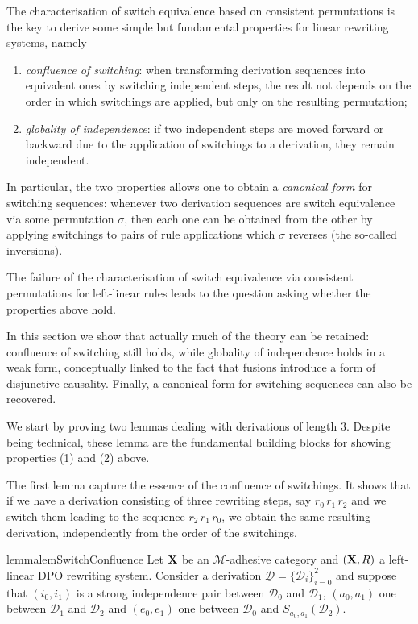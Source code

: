 \documentclass[a4paper,UKenglish,cleveref,pdftex, thm-restate,numberwithinsect,anonymous]{lipics}
\def\R{\mathsf{R}}
\def\X{\textbf {\textup{X}}}
\newcommand{\dder}[1]{\mathscr{#1}}
\newcommand{\der}[1]{\underline{\dder{#1}}}
\begin{document}
The characterisation of switch equivalence based on consistent permutations is the key to
derive some simple but fundamental properties for linear rewriting systems, namely
\begin{enumerate}
\item \emph{confluence of switching}: when transforming derivation
  sequences into equivalent ones by switching independent steps, the
  result not depends on the order in which switchings are applied, but
  only on the resulting permutation;
  
\item \emph{globality of independence}: if two independent steps are
  moved forward or backward due to the application of switchings to a
  derivation, they remain independent.
\end{enumerate}


In particular, the two properties allows one to obtain a \emph{canonical form} for switching sequences: whenever two derivation sequences are switch equivalence via some permutation $\sigma$, then each one can be obtained from the other by applying switchings to pairs of rule applications which $\sigma$ reverses (the so-called inversions).

The failure of the characterisation of switch equivalence via
consistent permutations for left-linear rules leads to the
question asking whether the properties above hold.

In this section we show that actually much of the theory can be retained: confluence of switching still holds, while globality of independence holds in a weak form, conceptually linked to the fact that fusions introduce a form of disjunctive causality. Finally, a canonical form for switching sequences can also be recovered.

We start by proving two lemmas dealing with derivations of length
$3$. Despite being technical, these lemma are the fundamental building blocks for showing properties (1) and (2) above.

The first lemma capture the essence of the confluence of
switchings. It shows that if we have a derivation consisting of three
rewriting steps, say $r_0\, r_1\, r_2$ and we switch them leading to the
sequence $r_2\, r_1\, r_0$, we obtain the same resulting derivation,
independently from the order of the switchings.


\begin{restatable}{lemma}{lemSwitchConfluence}
  \label{lem:switch-confluence}
  Let $\X$ be an $\mathcal{M}$-adhesive category and $(\X,\R)$ a
  left-linear DPO rewriting system.
  Consider a derivation $\der{D}=\{\dder{D}_i\}_{i=0}^2$ and suppose
  that $(i_0,i_1)$ is a strong independence pair between $\dder{D}_0$
  and $\dder{D}_1$, $(a_0,a_1)$ one between $\dder{D}_1$ and
  $\dder{D}_2$ and $(e_0, e_1)$ one between $\dder{D}_0$ and
  $S_{a_0,a_1}(\dder{D}_2)$.
\end{restatable}
\end{document}
